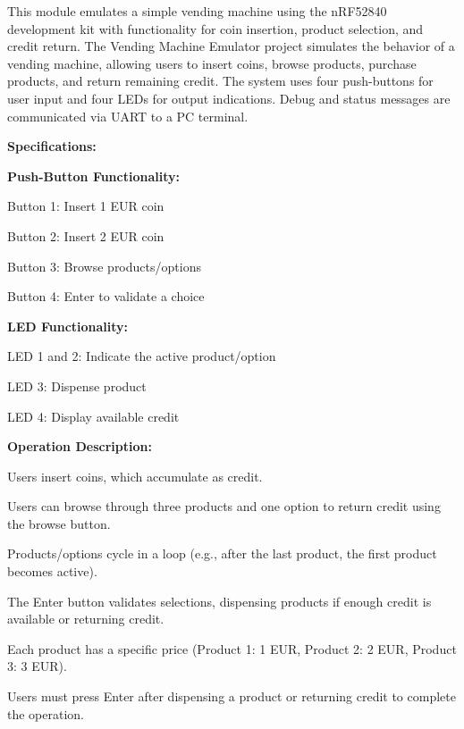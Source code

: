 This module emulates a simple vending machine using the n\+RF52840 development kit with functionality for coin insertion, product selection, and credit return. The Vending Machine Emulator project simulates the behavior of a vending machine, allowing users to insert coins, browse products, purchase products, and return remaining credit. The system uses four push-\/buttons for user input and four LEDs for output indications. Debug and status messages are communicated via UART to a PC terminal.

{\bfseries{Specifications\+:}}
\begin{DoxyItemize}
\item {\bfseries{Push-\/\+Button Functionality\+:}}
\begin{DoxyItemize}
\item Button 1\+: Insert 1 EUR coin
\item Button 2\+: Insert 2 EUR coin
\item Button 3\+: Browse products/options
\item Button 4\+: Enter to validate a choice
\end{DoxyItemize}
\item {\bfseries{LED Functionality\+:}}
\begin{DoxyItemize}
\item LED 1 and 2\+: Indicate the active product/option
\item LED 3\+: Dispense product
\item LED 4\+: Display available credit
\end{DoxyItemize}
\item {\bfseries{Operation Description\+:}}
\begin{DoxyItemize}
\item Users insert coins, which accumulate as credit.
\item Users can browse through three products and one option to return credit using the browse button.
\item Products/options cycle in a loop (e.\+g., after the last product, the first product becomes active).
\item The Enter button validates selections, dispensing products if enough credit is available or returning credit.
\item Each product has a specific price (Product 1\+: 1 EUR, Product 2\+: 2 EUR, Product 3\+: 3 EUR).
\item Users must press Enter after dispensing a product or returning credit to complete the operation.
\end{DoxyItemize}

\end{DoxyItemize}
